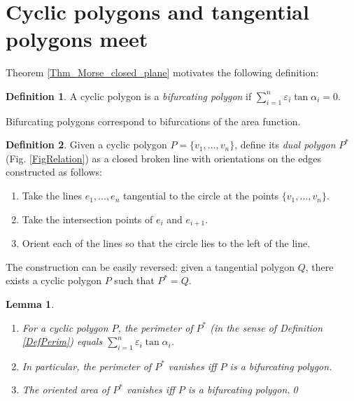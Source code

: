 \documentclass[12pt]{amsart}
\theoremstyle{plain}
\newtheorem{lemma}{Lemma}
\theoremstyle{definition}
\newtheorem{definition}{Definition}
\theoremstyle{remark}
\theoremstyle{plain}
\theoremstyle{definition}
\begin{document}
\section{Cyclic polygons and tangential polygons meet}
Theorem \ref{Thm_Morse_closed_plane} motivates the following definition:

\begin{definition}
A cyclic polygon is a \textit{bifurcating polygon} if $\sum_{i=1}^n \varepsilon_i \tan \alpha_i=0$.
\end{definition}
Bifurcating polygons correspond to bifurcations of the area function.

\begin{definition}
Given a cyclic polygon $P=\{v_1,...,v_n\}$, define its \textit{dual  polygon} $P^*$ (Fig. \ref{FigRelation}) as a closed broken line with orientations on the edges  constructed as follows:

\begin{enumerate}
  \item  Take the lines $e_1,...,e_n$ tangential to the circle at the points $\{v_1,...,v_n\}$.
  \item Take the intersection points of $e_i$ and $e_{i+1}$.
  \item  Orient each of the lines so that the circle lies to the left of the line.
\end{enumerate}


The construction can be easily reversed: given a tangential polygon $Q$,  there exists a cyclic polygon $P$ such that $P^*=Q$.
\begin{comment}
Here is the reversing construction:
\begin{enumerate}
  \item Take the tangential points of the edges.
  \item Connect them into a closed broken line according to the ordering of the slopes.
\end{enumerate}
\end{comment}
\end{definition}

\begin{lemma}\label{LemmaBifurc}  \begin{enumerate}
                 \item For a cyclic polygon $P$, the perimeter of $P^*$ (in the sense of Definition \ref{DefPerim}) equals $\sum_{i=1}^n \varepsilon_i \tan \alpha_i$.
                 \item In particular, the perimeter of $P^*$ vanishes iff $P$ is a bifurcating polygon.
                 \item  The oriented area of $P^*$ vanishes iff $P$ is a bifurcating polygon.\qed
               \end{enumerate}
\end{lemma}
\end{document}
